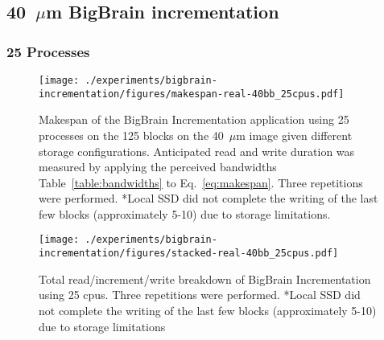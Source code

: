 \documentclass[conference]{IEEEtran}
\newcommand{\bigbrain}{BigBrain\xspace}
\begin{document}
\subsection{40~$\mu$m \bigbrain incrementation}
\subsubsection{25 Processes}
\begin{figure}
    \texttt{[image: ./experiments/bigbrain-incrementation/figures/makespan-real-40bb\_25cpus.pdf]}
    \captionsetup{belowskip=-10pt}
    \caption{Makespan of the \bigbrain Incrementation application using 25 
             processes on the 125 blocks on the 40~$\mu$m image given different
             storage configurations. Anticipated read and write duration was 
             measured by applying the perceived bandwidths Table~\ref{table:bandwidths}
             to Eq.~\ref{eq:makespan}. Three 
             repetitions were performed. *Local SSD did not complete the
         writing of the last few blocks (approximately 5-10) due to storage limitations.}\label{fig:makespan-25cpus}
\end{figure}
\begin{figure}
    \texttt{[image: ./experiments/bigbrain-incrementation/figures/stacked-real-40bb\_25cpus.pdf]}
    \captionsetup{belowskip=0pt}
    \caption{Total read/increment/write breakdown of \bigbrain Incrementation using 25 cpus. Three repetitions were performed. *Local SSD did not
    complete the writing of the last few blocks (approximately 5-10) due to storage limitations}\label{fig:stacked-25cpus}
\end{figure}
\end{document}

